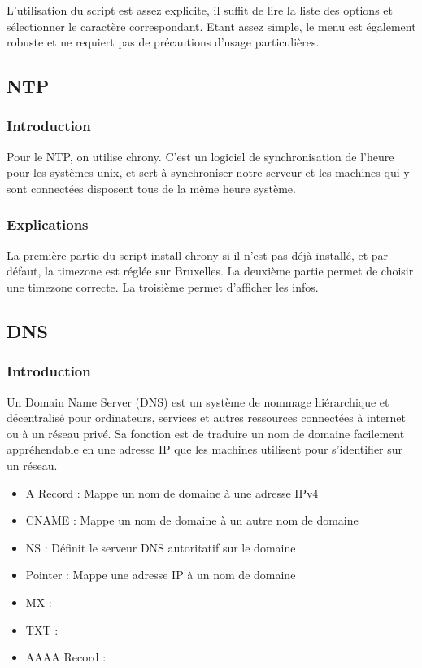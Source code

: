 \documentclass{article}
\begin{document}
L'utilisation du script est assez explicite, il suffit de lire la liste des options et sélectionner le caractère correspondant. Etant assez simple, le menu est également robuste et ne requiert pas de précautions d'usage particulières.

 \subsection{NTP}
 \subsubsection{Introduction}
 Pour le NTP, on utilise chrony.
 C'est un logiciel de synchronisation de l'heure pour les systèmes unix, et sert à synchroniser notre serveur et les machines qui y sont connectées disposent tous de la même heure système.
 \subsubsection{Explications}
 La première partie du script install chrony si il n'est pas déjà installé, et par défaut, la timezone est réglée sur Bruxelles.
 La deuxième partie permet de choisir une timezone correcte.
 La troisième permet d'afficher les infos.


	\subsection{DNS}
	\subsubsection{Introduction}
	Un Domain Name Server (DNS) est un système de nommage hiérarchique et décentralisé pour ordinateurs, services et autres ressources connectées à internet ou à un réseau privé. Sa fonction est de traduire un nom de domaine facilement appréhendable en une adresse IP que les machines utilisent pour s'identifier sur un réseau.
	
	\begin{itemize}
	\item A Record : Mappe un nom de domaine à une adresse IPv4
	\item CNAME : Mappe un nom de domaine à un autre nom de domaine
	\item NS : Définit le serveur DNS autoritatif sur le domaine
	\item Pointer : Mappe une adresse IP à un nom de domaine
	\item MX :
	\item TXT :
	\item AAAA Record :
	\end{itemize}
	
\end{document}
